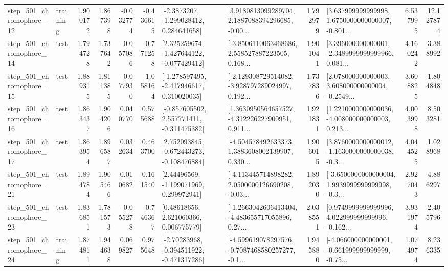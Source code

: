 \begin{tabular}{llrrrrllrlrr}
  step\_501\_chromophore\_12 &  training &      1.900172 &    1.867398 &     -0.032774 & -0.436615 &     [-2.3873207, -1.299028412, 0.284641658] &  [3.9180813099289704, 2.1887088394296685, -0.00... &       1.792979 &  [3.637999999999998, 1.6750000000000007, -0.801... &            6.537995 &         12.127874 \\
  step\_501\_chromophore\_14 &      test &      1.794728 &    1.737642 &     -0.057086 & -0.771258 &   [2.325259674, -1.427644122, -0.077429412] &  [-3.8506110063468686, 2.558527887223505, 0.168... &       1.901041 &  [3.396000000000001, -2.3489999999999966, 0.081... &            4.160242 &          3.388992 \\
  step\_501\_chromophore\_15 &      test &      1.889315 &    1.811385 &     -0.077930 & -1.058164 &   [-1.278597495, -2.417946617, 0.310020035] &  [-2.129308729514082, -3.928797289024997, 0.192... &       1.737836 &  [2.078000000000003, 3.608000000000004, -0.2549... &            3.608825 &          1.804848 \\
  step\_501\_chromophore\_16 &      test &      1.863437 &    1.904206 &      0.040770 &  0.575688 &   [-0.857605502, 2.557771411, -0.311475382] &  [1.3630950564657527, -4.312226227900951, 0.911... &       1.921831 &  [1.2210000000000036, -4.008000000000003, 0.213... &            4.003998 &          8.503281 \\
  step\_501\_chromophore\_17 &      test &      1.863954 &    1.896587 &      0.032634 &  0.463700 &   [2.752093845, -0.672443273, -0.108476884] &  [-4.504578492633373, 1.3883608002139907, 0.330... &       1.906015 &  [3.8760000000000012, -1.1630000000000038, -0.3... &            4.044525 &          1.028968 \\
  step\_501\_chromophore\_21 &      test &      1.894784 &    1.905466 &      0.010682 &  0.161540 &     [2.44496569, -1.199071969, 0.299972941] &  [-4.113445714898282, 2.0500000126690208, -0.03... &       1.892030 &  [-3.6500000000000004, 1.9939999999999998, -0.3... &            2.927043 &          4.886297 \\
  step\_501\_chromophore\_23 &      test &      1.836851 &    1.781573 &     -0.055278 & -0.746367 &      [0.48618656, 2.621060366, 0.006775779] &  [-1.2663042606413404, -4.483655717055896, 0.27... &       2.038551 &  [0.9749999999999996, 4.022999999999996, -0.162... &            3.931974 &          2.405796 \\
  step\_501\_chromophore\_24 &  training &      1.874811 &    1.944638 &      0.069827 &  0.975648 &   [-2.70283968, -0.394511922, -0.471317286] &  [-4.599619078297576, -0.7087468580257277, -0.1... &       1.945880 &  [-4.066000000000001, -0.661999999999999, -0.75... &            1.074974 &          8.236335 \\

\end{tabular}

